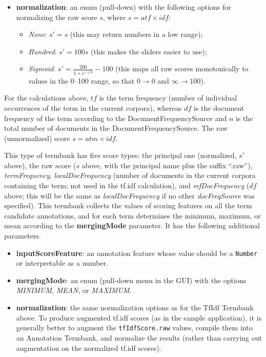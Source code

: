 \begin{itemize}
\item \textbf{normalization}: an enum (pull-down) with the following options for
  normalizing the raw score $s$, where $s=\mathit{atf}\times\mathit{idf}$:
  \begin{itemize}
  \item \emph{None}: $s'=s$ (this may return numbers in a low range);
  \item \emph{Hundred}: $s'=100s$ (this makes the sliders easier to use);
  \item \emph{Sigmoid}: $s'=\frac{200}{1+e^{-s/k}}-100$ (this maps all raw scores
    monotonically to values in the 0--100 range, so that $0{\rightarrow}0$ and
    ${\infty}{\rightarrow}100$).
  \end{itemize}
\end{itemize}
For the calculations above, $\mathit{tf}$ is the term frequency (number of
individual occurrences of the term in the current corpora), whereas
$\mathit{df}$ is the document frequency of the term according to the
DocumentFrequencySource and $n$ is the total number of documents in the
DocumentFrequencySource.  The raw (unnormalized) score
$s=\mathit{atm}\times\mathit{idf}$.

This type of termbank has five score types: the principal one (normalized, $s'$
above), the raw score ($s$ above, with the principal name plus the suffix
``.raw''), \emph{termFrequency}, \emph{localDocFrequency} (number of documents
in the current corpora containing the term; not used in the tf.idf calculation),
and \emph{refDocFrequency} ($\mathit{df}$ above; this will be the same as
\emph{localDocFrequency} if no other \emph{docFreqSource} was specified).
This termbank collects the values of scoring features on all the term candidate
annotations, and for each term determines the minimum, maximum, or mean
according to the \textbf{mergingMode} parameter.  It has the following
additional parameters.
\begin{itemize}
\item \textbf{inputScoreFeature}: an annotation feature whose value should be a
  \texttt{Number} or interpretable as a number.
\item \textbf{mergingMode}: an enum (pull-down menu in the GUI) with the options
  \emph{MINIMUM}, \emph{MEAN}, or \emph{MAXIMUM}.
\item \textbf{normalization}: the same normalization options as for the TfIdf
  Termbank above.  To produce augmented tf.idf scores (as in the sample
  application), it is generally better to augment the \texttt{tfIdfScore.raw}
  values, compile them into an Annotation Termbank, and normalize the results
  (rather than carrying out augmentation on the normalized tf.idf scores).
\end{itemize}

